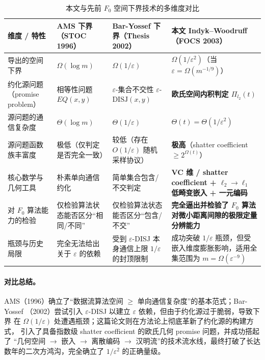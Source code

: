 \documentclass[UTF8, 11pt, a4paper, linestretch=1.15]{ctexart}
\theoremstyle{zhstyle}
\newcommand{\eps}{\varepsilon}
\newcommand{\Fzero}{F_0}
\begin{document}
	\begin{table}[htbp]
		\centering
		\small
		\renewcommand{\arraystretch}{1.18}
		\caption{本文与先前 $\Fzero$ 空间下界技术的多维度对比}
		\label{tab:comparison}
		\begin{tabularx}{\textwidth}{@{}>{\raggedright\arraybackslash}p{2.6cm}
				>{\raggedright\arraybackslash}X
				>{\raggedright\arraybackslash}X
				>{\raggedright\arraybackslash}X@{}}
			\toprule
			维度 / 特性 & AMS 下界（STOC 1996）~\cite{AMS99} &
			Bar-Yossef 下界（Thesis 2002）~\cite{BarYossef02} &
			\textbf{本文 Indyk--Woodruff（FOCS 2003）}~\cite{IW03} \\
			\midrule
			导出的空间下界 & $\Omega(\log m)$ & $\Omega(1/\eps)$ &
			\textbf{$\Omega(1/\eps^2)$}（当 $\eps = \Omega(m^{-1/9})$） \\
			约化源问题（promise problem） & 相等性问题 $EQ(x, y)$ &
			$\eps$-集合不交性 $\eps$-$\mathrm{DISJ}(x, y)$ &
			\textbf{欧氏空间内积判定 $\Pi_{l_2}(t)$} \\
			源问题的通信复杂度 & $\Theta(\log m)$ & $\Theta(1/\eps)$ &
			$\Theta(t) = \Theta(1/\eps^2)$ \\
			源问题函数族丰富度 & 极低（仅判定是否完全一致） &
			较低（存在 $O(1/\eps)$ 随机采样协议） &
			\textbf{极高}（shatter coefficient $\geq 2^{\Omega(t)}$） \\
			核心数学与几何工具 & 朴素单向通信约化 & 简单集合包含/不交判定 &
			\textbf{VC 维 / shatter coefficient + $\ell_2 \to \ell_1$ 低畸变嵌入
				+ 一元编码} \\
			对 $\Fzero$ 算法能力的检验 &
			仅检验算法状态能否区分“相同/不同” &
			仅检验算法状态能否区分“包含/不交” &
			\textbf{完全逼出并检验了 $\Fzero$ 算法对微小距离间隙的极限定量分辨能力} \\
			瓶颈与历史局限 & 完全无法给出关于 $\eps$ 的依赖 &
			受到 $\eps$-DISJ 本身通信上限 $1/\eps$ 的封顶限制 &
			成功突破 $1/\eps$ 瓶颈，但受嵌入维度膨胀影响，适用全集范围为
			$m = \Omega(\eps^{-9})$ \\
			\bottomrule
		\end{tabularx}
	\end{table}
	
	\paragraph{对比总结。}
	AMS（1996）确立了“数据流算法空间 $\geq$ 单向通信复杂度”的基本范式；Bar-Yossef
	（2002）尝试引入 $\eps$-DISJ 以建立 $\eps$ 依赖，但由于约化源过于脆弱，导致下界
	在 $\Omega(1/\eps)$ 处遭遇瓶颈；这篇论文则在方法论上彻底革新了约化源的构建方式，
	引入了具备指数级 shatter coefficient 的欧氏几何 promise 问题，并成功搭起了
	“几何空间 $\to$ 嵌入 $\to$ 离散编码 $\to$ 汉明流”的技术流水线，最终打破了长达
	数年的二次方鸿沟，完全确立了 $1/\eps^2$ 的正确量级。
	
\end{document}
